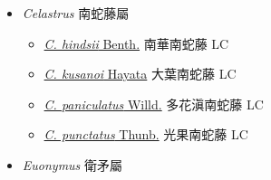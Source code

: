 
  \begin{itemize}
 \item[] \textit{Celastrus} 南蛇藤屬
                                
  \begin{itemize}
        \item[] \href{http://www.theplantlist.org/tpl1.1/search?q=Celastrus+hindsii}{\textit{C. hindsii} Benth.}   南華南蛇藤   LC
        \item[] \href{http://www.theplantlist.org/tpl1.1/search?q=Celastrus+kusanoi}{\textit{C. kusanoi} Hayata}   大葉南蛇藤   LC
        \item[] \href{http://www.theplantlist.org/tpl1.1/search?q=Celastrus+paniculatus}{\textit{C. paniculatus} Willd.}   多花滇南蛇藤   LC
        \item[] \href{http://www.theplantlist.org/tpl1.1/search?q=Celastrus+punctatus}{\textit{C. punctatus} Thunb.}   光果南蛇藤   LC
  \end{itemize}
 \item[] \textit{Euonymus} 衛矛屬
                                

\end{itemize}
